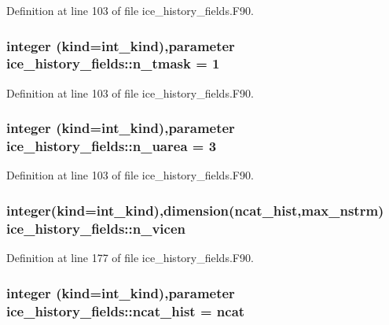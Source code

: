 Definition at line 103 of file ice\_\-history\_\-fields.F90.\hypertarget{namespaceice__history__fields_a357c5d0fb7837fb0461704f23f46d101}{
\subsubsection[{n\_\-tmask}]{\setlength{\rightskip}{0pt plus 5cm}integer (kind=int\_\-kind),parameter {\bf ice\_\-history\_\-fields::n\_\-tmask} = 1}}
\label{namespaceice__history__fields_a357c5d0fb7837fb0461704f23f46d101}


Definition at line 103 of file ice\_\-history\_\-fields.F90.\hypertarget{namespaceice__history__fields_a40dda082d8b468c6159dfd8d7fe5763d}{
\subsubsection[{n\_\-uarea}]{\setlength{\rightskip}{0pt plus 5cm}integer (kind=int\_\-kind),parameter {\bf ice\_\-history\_\-fields::n\_\-uarea} = 3}}
\label{namespaceice__history__fields_a40dda082d8b468c6159dfd8d7fe5763d}


Definition at line 103 of file ice\_\-history\_\-fields.F90.\hypertarget{namespaceice__history__fields_afd312fa27e4e7c7979312795eaed3435}{
\subsubsection[{n\_\-vicen}]{\setlength{\rightskip}{0pt plus 5cm}integer(kind=int\_\-kind),dimension({\bf ncat\_\-hist},max\_\-nstrm) {\bf ice\_\-history\_\-fields::n\_\-vicen}}}
\label{namespaceice__history__fields_afd312fa27e4e7c7979312795eaed3435}


Definition at line 177 of file ice\_\-history\_\-fields.F90.\hypertarget{namespaceice__history__fields_ad4675933f882f223e8ec25c5c938b13e}{
\subsubsection[{ncat\_\-hist}]{\setlength{\rightskip}{0pt plus 5cm}integer (kind=int\_\-kind),parameter {\bf ice\_\-history\_\-fields::ncat\_\-hist} = ncat}}
\label{namespaceice__history__fields_ad4675933f882f223e8ec25c5c938b13e}


